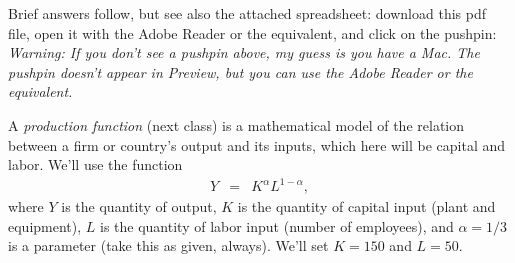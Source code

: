 \documentclass[12pt]{exam}
\renewcommand{\log}{\ln}
\begin{document}
\begin{questions}

\begin{solution}
Brief answers follow,
but see also the attached spreadsheet:
download this pdf file, open it with the Adobe Reader or the equivalent, 
and click on the pushpin:
 \\
{\it Warning:  If you don't see a pushpin above, my guess is you have a Mac.
The pushpin doesn't appear in Preview,
but you can use the Adobe Reader or the equivalent.}
\end{solution}



A {\it production function\/} (next class) is a mathematical
model of the relation between a firm or country's output
and its inputs, which here will be capital and labor.
We'll use the function
\begin{eqnarray}
    Y &=& K^\alpha L^{1-\alpha} ,
    \label{eq:production}
\end{eqnarray}
where $Y$ is the quantity of output,
$K$ is the quantity of capital input (plant and equipment),
$L$ is the quantity of labor input (number of employees),
and $\alpha = 1/3$ is a parameter (take this as given, always).
We'll set $K=150$ and $L = 50$.

\end{questions}
\end{document}

